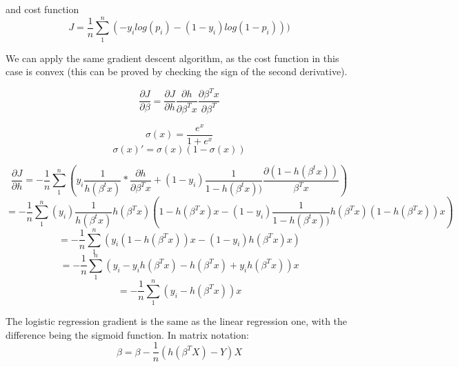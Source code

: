 \documentclass[12pt,a4paper]{article}
\begin{document}
and cost function $$J = \frac{1}{n}\sum_1^{n}(-y_{i}log(p_{i}) - (1-y_{i})log(1-p_{i})))$$

We can apply the same gradient descent algorithm, as the cost function in this case is convex (this can be proved by checking the sign of the second derivative). 

$$\frac{\partial J}{\partial \beta} = \frac{\partial J}{\partial h} \frac{\partial h}{\partial \beta^{T}x}\frac{\partial \beta^{T}x}{\partial \beta^{T}}$$

$$\sigma(x) = \frac{e^{x}}{1 + e^{x}}$$
$$\sigma(x)' = \sigma(x)(1 - \sigma(x))$$

$$\frac{\partial{J}}{\partial{h}} = -\frac{1}{n}\sum_{1}^n(y_{i}\frac{1}{h(\beta^{t}x)} * \frac{\partial{h}}{\partial{\beta^{T}x}} + (1-y_{i})\frac{1}{1 - h(\beta^{t}x))}\frac{\partial{(1 - h(\beta^{t}x))}}{\beta^{T}x})$$
$$= -\frac{1}{n}\sum_{1}^n(y_{i})\frac{1}{h(\beta^{t}x)}h(\beta^{T}x)(1 - h(\beta^{T}x)x - (1 - y_{i})\frac{1}{1 - h(\beta^{t}x))}h(\beta^{T}x)(1 - h(\beta^{T}x))x)$$
$$= -\frac{1}{n}\sum_{1}^{n}(y_{i}(1 - h(\beta^{T}x))x - (1 - y_{i})h(\beta^{T}x)x)$$
$$= -\frac{1}{n}\sum_{1}^{n}(y_{i} - y_{i}h(\beta^{T}x) - h(\beta^{T}x) + y_{i}h(\beta^{T}x))x$$
$$= -\frac{1}{n}\sum_{1}^{n}(y_{i} - h(\beta^{T}x))x$$

The logistic regression gradient is the same as the linear regression one, with the difference being the sigmoid function.
In matrix notation:
$$\beta = \beta - \frac{1}{n}(h(\beta^{T}X)- Y)X$$

\maketitle
\end{document}
